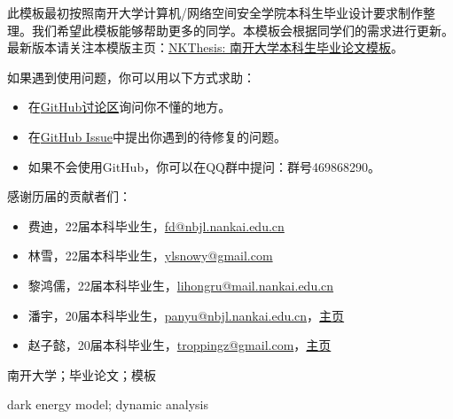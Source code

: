 

\begin{zhaiyao}
\begin{spacing}{1.5}
{

此模板最初按照南开大学计算机/网络空间安全学院本科生毕业设计要求制作整理。我们希望此模板能够帮助更多的同学。本模板会根据同学们的需求进行更新。最新版本请关注本模版主页：\href{https://tr0py.github.io/NKU-thesis-template-2020/}{NKThesis: 南开大学本科生毕业论文模板}。

如果遇到使用问题，你可以用以下方式求助：
\begin{itemize}
	\item 在\href{https://github.com/Tr0py/NKU-thesis-template-2020/discussions}{GitHub讨论区}询问你不懂的地方。
	\item 在\href{https://github.com/Tr0py/NKU-thesis-template-2020/issues}{GitHub Issue}中提出你遇到的待修复的问题。
	\item 如果不会使用GitHub，你可以在QQ群中提问：群号469868290。
\end{itemize}

	
感谢历届的贡献者们：
\begin{itemize}
    \item 费迪，22届本科毕业生，\url{fd@nbjl.nankai.edu.cn}
    \item 林雪，22届本科毕业生，\url{ylsnowy@gmail.com}
    \item 黎鸿儒，22届本科毕业生，\url{lihongru@mail.nankai.edu.cn}
    \item 潘宇，20届本科毕业生，\url{panyu@nbjl.nankai.edu.cn}，\href{https://nbjl.nankai.edu.cn/2019/0513/c19244a264683/page.htm}{主页}
    \item 赵子懿，20届本科毕业生，\url{troppingz@gmail.com}，\href{https://tr0py.github.io/}{主页}
\end{itemize}
}

\end{spacing}
\end{zhaiyao}




\begin{guanjianci}
南开大学；毕业论文；模板
\end{guanjianci}



\begin{abstract}
\begin{spacing}{1.5}
Since 1998, two independent supernova research groups have discovered that the universe is accelerating, and the dark energy has become a hot topic in cosmology. 

\end{spacing}
\end{abstract}


\begin{keywords}
dark energy model; dynamic analysis
\end{keywords} 
